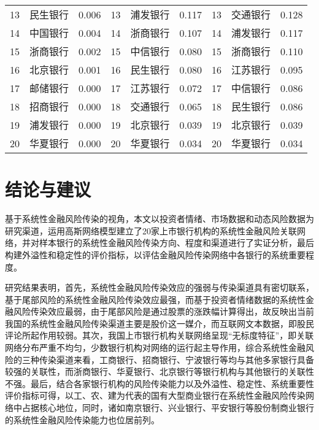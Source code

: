 \documentclass[lang=cn]{elegantpaper}
\begin{document}
\begin{table}[htb]
\begin{tabular*}{\textwidth}{@{}@{\extracolsep{\fill}}ccccccccc@{}}
    13 & 民生银行 & 0.006 & 13 & 浦发银行 & 0.117 & 13 & 交通银行 & 0.128 \\
    14 & 中国银行 & 0.004 & 14 & 浙商银行 & 0.107 & 14 & 浦发银行 & 0.117 \\
    15 & 浙商银行 & 0.002 & 15 & 中信银行 & 0.080 & 15 & 浙商银行 & 0.110 \\
    16 & 北京银行 & 0.001 & 16 & 民生银行 & 0.080 & 16 & 江苏银行 & 0.095 \\
    17 & 邮储银行 & 0.000 & 17 & 江苏银行 & 0.072 & 17 & 中信银行 & 0.086 \\
    18 & 招商银行 & 0.000 & 18 & 交通银行 & 0.065 & 18 & 民生银行 & 0.086 \\
    19 & 浦发银行 & 0.000 & 19 & 北京银行 & 0.039 & 19 & 北京银行 & 0.039 \\
    20 & 华夏银行 & 0.000 & 20 & 华夏银行 & 0.034 & 20 & 华夏银行 & 0.034 \\ \bottomrule
    \end{tabular*}
\end{table}
\section{结论与建议}

基于系统性金融风险传染的视角，本文以投资者情绪、市场数据和动态风险数据为研究渠道，运用高斯网络模型建立了20家上市银行机构的系统性金融风险关联网络，并对样本银行的系统性金融风险传染方向、程度和渠道进行了实证分析，最后构建外溢性和稳定性的评价指标，以评估金融风险传染网络中各银行的系统重要程度。

研究结果表明，首先，系统性金融风险传染效应的强弱与传染渠道具有密切联系，基于尾部风险的系统性金融风险传染效应最强，而基于投资者情绪数据的系统性金融风险传染效应最弱，由于尾部风险是通过股票的涨跌幅计算得出，故反映出当前我国的系统性金融风险传染渠道主要是股价这一媒介，而互联网文本数据，即股民评论所起作用较弱。其次，我国上市银行机构关联网络呈现“无标度特征”，即关联网络分布严重不均匀，少数银行机构对网络的运行起主导作用，综合系统性金融风险的三种传染渠道来看，工商银行、招商银行、宁波银行等均与其他多家银行具备较强的关联性，而浙商银行、华夏银行、北京银行等银行机构与其他银行的关联性不强。最后，结合各家银行机构的风险传染能力以及外溢性、稳定性、系统重要性评价指标可得，以工、农、建为代表的国有大型商业银行在系统性金融风险传染网络中占据核心地位，同时，诸如南京银行、兴业银行、平安银行等股份制商业银行的系统性金融风险传染能力也位居前列。
\end{document}

